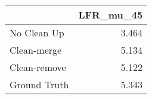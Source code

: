 \begin{tabular}{lr}
\toprule
{} & LFR_mu_45 \\
\midrule
No Clean Up  &     3.464 \\
Clean-merge  &     5.134 \\
Clean-remove &     5.122 \\
Ground Truth &     5.343 \\
\bottomrule
\end{tabular}

